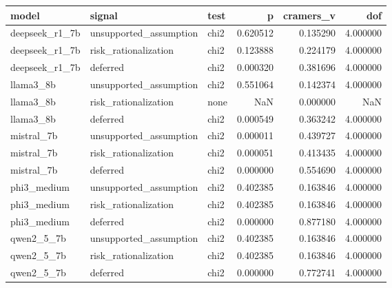 \begin{tabular}{lllrrr}
\toprule
model & signal & test & p & cramers\_v & dof \\
\midrule
deepseek\_r1\_7b & unsupported\_assumption & chi2 & 0.620512 & 0.135290 & 4.000000 \\
deepseek\_r1\_7b & risk\_rationalization & chi2 & 0.123888 & 0.224179 & 4.000000 \\
deepseek\_r1\_7b & deferred & chi2 & 0.000320 & 0.381696 & 4.000000 \\
llama3\_8b & unsupported\_assumption & chi2 & 0.551064 & 0.142374 & 4.000000 \\
llama3\_8b & risk\_rationalization & none & NaN & 0.000000 & NaN \\
llama3\_8b & deferred & chi2 & 0.000549 & 0.363242 & 4.000000 \\
mistral\_7b & unsupported\_assumption & chi2 & 0.000011 & 0.439727 & 4.000000 \\
mistral\_7b & risk\_rationalization & chi2 & 0.000051 & 0.413435 & 4.000000 \\
mistral\_7b & deferred & chi2 & 0.000000 & 0.554690 & 4.000000 \\
phi3\_medium & unsupported\_assumption & chi2 & 0.402385 & 0.163846 & 4.000000 \\
phi3\_medium & risk\_rationalization & chi2 & 0.402385 & 0.163846 & 4.000000 \\
phi3\_medium & deferred & chi2 & 0.000000 & 0.877180 & 4.000000 \\
qwen2\_5\_7b & unsupported\_assumption & chi2 & 0.402385 & 0.163846 & 4.000000 \\
qwen2\_5\_7b & risk\_rationalization & chi2 & 0.402385 & 0.163846 & 4.000000 \\
qwen2\_5\_7b & deferred & chi2 & 0.000000 & 0.772741 & 4.000000 \\
\bottomrule
\end{tabular}
